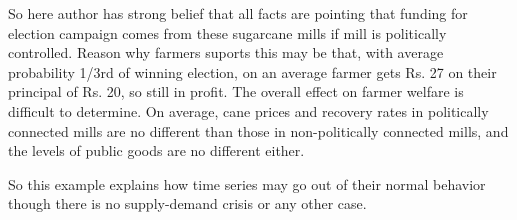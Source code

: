 So here author has strong belief that all facts are pointing that funding for election campaign comes from these sugarcane mills if mill is  politically controlled. Reason why farmers suports this may be that, with average probability 1/3rd of winning election, on an average farmer gets Rs. 27 on their principal of Rs. 20, so still in profit. The overall effect on farmer welfare is difficult to determine. On average, cane prices and recovery rates in politically connected mills are no different than those in non-politically connected mills, and the levels of public goods are no different either. 

So this example explains how time series may go out of their normal behavior though there is no supply-demand crisis or any other case.


